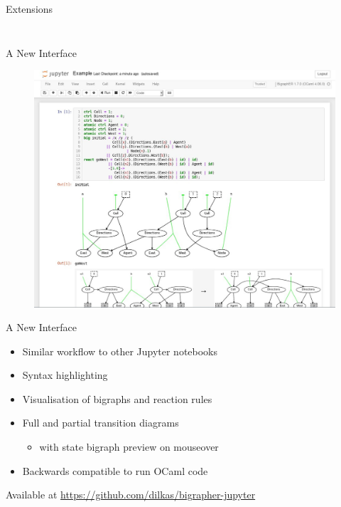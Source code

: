 \documentclass{beamer}
\begin{document}
\begin{frame}{Extensions}
\begin{columns}
\begin{column}{0.5\textwidth}
\begin{figure}
      \end{figure}
    \end{column}
  \end{columns}
  \pause
\end{frame}

\begin{frame}{A New Interface}
  \begin{figure}
    \centering
    \includegraphics{screenshot.jpg}
  \end{figure}
\end{frame}

\begin{frame}{A New Interface}
  \begin{itemize}
  \item Similar workflow to other Jupyter notebooks
  \item Syntax highlighting
  \item Visualisation of bigraphs and reaction rules
  \item Full and partial transition diagrams
    \begin{itemize}
    \item with state bigraph preview on mouseover
    \end{itemize}
  \item Backwards compatible to run OCaml code
  \end{itemize}
  \begin{block}{Available at}
    \url{https://github.com/dilkas/bigrapher-jupyter}
  \end{block}
\end{frame}
\end{document}
